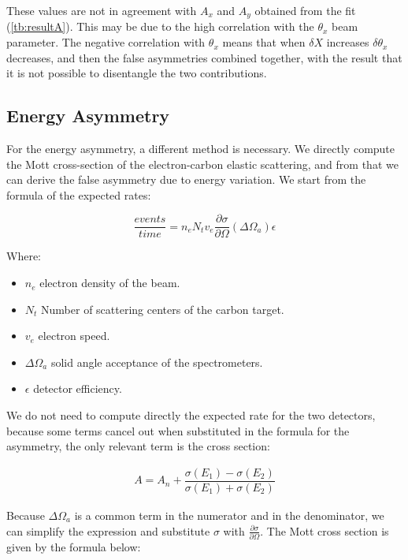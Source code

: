 These values are not in agreement with $A_{x}$ and $A_{y}$ obtained from the fit (\ref{tb:resultA}). This may be due to the high correlation with the $\theta_{x}$ beam parameter. The negative correlation with $\theta_{x}$ means that when $\delta X$ increases $\delta \theta_{x}$ decreases, and then the false asymmetries combined together, with the result that it is not possible to disentangle the two contributions. 

\subsection{Energy Asymmetry}

For the energy asymmetry, a different method is necessary. We directly compute the Mott cross-section of the electron-carbon elastic scattering, and from that we can derive the false asymmetry due to energy variation.
We start from the formula of the expected rates:

\begin{equation}
\frac{events}{time} = n_{e} N_{t} v_{e} \frac{\partial \sigma}{\partial \Omega} (\Delta \Omega_{a}) \epsilon 
\end{equation} 

Where:
\begin{itemize}
\item $n_{e}$ electron density of the beam.
\item $N_t$ Number of scattering centers of the carbon target.
\item $v_{e}$ electron speed.
\item $\Delta \Omega_{a}$ solid angle acceptance of the spectrometers.
\item $\epsilon$ detector efficiency.
\end{itemize}

We do not need to compute directly the expected rate for the two detectors, because some terms cancel out when substituted in the formula for the asymmetry, the only relevant term is the cross section:

\begin{align*}
A = A_{n} + \dfrac{\sigma(E_{1}) - \sigma(E_{2})}{\sigma(E_{1}) + \sigma(E_{2})}
\end{align*}

Because $\Delta \Omega_{a}$ is a common term in the numerator and in the denominator, we can simplify the expression and substitute $\sigma $ with $ \frac{\partial \sigma}{ \partial \Omega}$.
The Mott cross section is given by the formula below:

